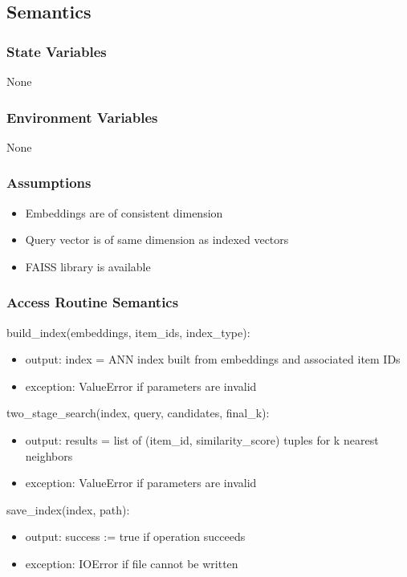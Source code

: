 \documentclass[12pt, titlepage]{article}
\begin{document}
\subsection{Semantics}

\subsubsection{State Variables}
None

\subsubsection{Environment Variables}

None

\subsubsection{Assumptions}

\begin{itemize}
  \item Embeddings are of consistent dimension
  \item Query vector is of same dimension as indexed vectors
  \item FAISS library is available
\end{itemize}

\subsubsection{Access Routine Semantics}

\noindent build\_index(embeddings, item\_ids, index\_type):
\begin{itemize}
\item output: index = ANN index built from embeddings and associated item IDs
\item exception: ValueError if parameters are invalid
\end{itemize}

\noindent two\_stage\_search(index, query, candidates, final\_k):
\begin{itemize}
\item output: results = list of (item\_id, similarity\_score) tuples for k nearest neighbors
\item exception: ValueError if parameters are invalid
\end{itemize}

\noindent save\_index(index, path):
\begin{itemize}
\item output: success := true if operation succeeds
\item exception: IOError if file cannot be written
\end{itemize}
\end{document}

